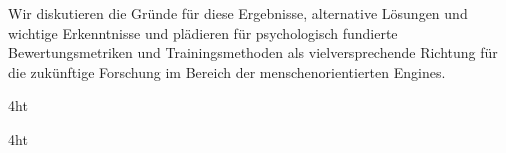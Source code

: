 \documentclass[
  a4paper,  %
  twoside,  %
  bibliography=totoc,
  headsepline,
  cleardoublepage=empty,
  parskip=half,
  draft=false
]{scrbook}
\begin{document}
Wir diskutieren die Gründe für diese Ergebnisse, alternative Lösungen und wichtige Erkenntnisse und plädieren für psychologisch fundierte Bewertungsmetriken und Trainingsmethoden als vielversprechende Richtung für die zukünftige Forschung im Bereich der menschenorientierten Engines.




\iftex4ht
\else
\fi

%
%

%
%
%






\iftex4ht
\else
\fi



\renewcommand*{\chapterpagestyle}{scrplain}
\pagestyle{scrheadings}
\pagestyle{scrheadings}
\ihead[]{}
\chead[]{}
\ohead[]{\headmark}
\cfoot[]{}
\ifoot[]{}
\end{document}
